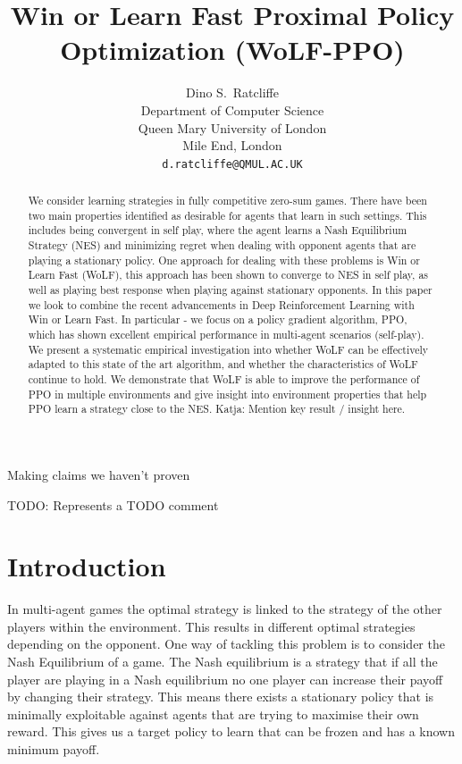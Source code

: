 \documentclass{article}
\title{Win or Learn Fast Proximal Policy Optimization (WoLF-PPO)}
\author{%
  Dino S.~Ratcliffe\\
  Department of Computer Science\\
  Queen Mary University of London\\
  Mile End, London \TODO{check proper address format} \\
  \texttt{d.ratcliffe@QMUL.AC.UK} \\
}
\newcommand\katja[1]{{\color{dark-cyan}Katja: #1}}
\newcommand\TODO[1]{{\color{red}TODO: #1}}
\newcommand\MAYBE[1]{{\color{blue} #1}}
\begin{document}
\maketitle

\MAYBE{Making claims we haven't proven}

\TODO{Represents a TODO comment}

\begin{abstract}
    We consider learning strategies in fully competitive zero-sum games. There have been two main properties identified as desirable for agents that learn in  such settings. This includes being convergent in self play, where the agent learns a Nash Equilibrium Strategy (NES) and minimizing regret when dealing with opponent agents that are playing a stationary policy. One approach for dealing with these problems is Win or Learn Fast (WoLF), this approach has been shown to converge to NES in self play, as well as playing best response when playing against stationary opponents. In this paper we look to combine the recent advancements in Deep Reinforcement Learning with Win or Learn Fast. In particular - we focus on a policy gradient algorithm, PPO, which has shown excellent empirical performance in multi-agent scenarios (self-play). We present a systematic empirical investigation into whether WoLF can be effectively adapted to this state of the art algorithm, and whether the characteristics of WoLF continue to hold. \MAYBE{We demonstrate that WoLF is able to improve the performance of PPO in multiple environments and give insight into environment properties that help PPO learn a strategy close to the NES.} \katja{Mention key result / insight here.}

\end{abstract}

\section{Introduction}

In multi-agent games the optimal strategy is linked to the strategy of the other players within the environment. This results in different optimal strategies depending on the opponent. One way of tackling this problem is to consider the Nash Equilibrium of a game. The Nash equilibrium is a strategy that if all the player are playing in a Nash equilibrium no one player can increase their payoff by changing their strategy. This means there exists a stationary policy that is minimally exploitable against agents that are trying to maximise their own reward. This gives us a target policy to learn that can be frozen and has a known minimum payoff.
\end{document}
